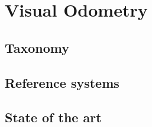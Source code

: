 \section{Visual Odometry}\label{sec:visual-odometry}

\subsection{Taxonomy}\label{subsec:tassonomy}

\subsection{Reference systems}\label{subsec:reference-systems}

\subsection{State of the art}\label{subsec:state-of-the-art}
